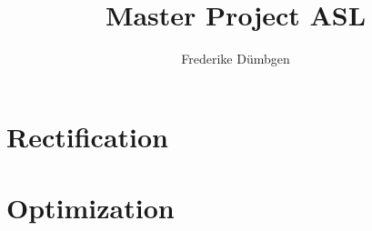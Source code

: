 \documentclass{report}
\begin{document}
\title{Master Project ASL}
\author{Frederike Dümbgen}

\maketitle

\chapter{Rectification}


\chapter{Optimization}





\end{document}
